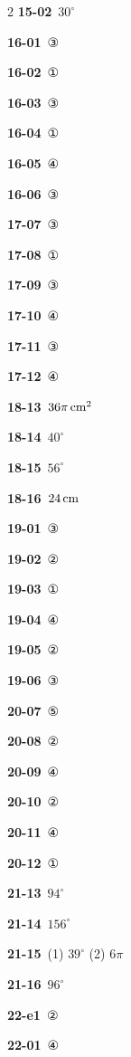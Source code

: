 \documentclass[10pt,a4paper]{article}
\begin{document}
\begin{multicols}{2}
\noindent\textbf{15-02}\ $30^\circ$\par
\noindent\textbf{16-01}\ ③\par
\noindent\textbf{16-02}\ ①\par
\noindent\textbf{16-03}\ ③\par
\noindent\textbf{16-04}\ ①\par
\noindent\textbf{16-05}\ ④\par
\noindent\textbf{16-06}\ ③\par
\noindent\textbf{17-07}\ ③\par
\noindent\textbf{17-08}\ ①\par
\noindent\textbf{17-09}\ ③\par
\noindent\textbf{17-10}\ ④\par
\noindent\textbf{17-11}\ ③\par
\noindent\textbf{17-12}\ ④\par
\noindent\textbf{18-13}\ $36\pi\mkern3mu \mathrm{cm}^2$\par
\noindent\textbf{18-14}\ $40^\circ$\par
\noindent\textbf{18-15}\ $56^\circ$\par
\noindent\textbf{18-16}\ $24\mkern3mu \mathrm{cm}$\par
\noindent\textbf{19-01}\ ③\par
\noindent\textbf{19-02}\ ②\par
\noindent\textbf{19-03}\ ①\par
\noindent\textbf{19-04}\ ④\par
\noindent\textbf{19-05}\ ②\par
\noindent\textbf{19-06}\ ③\par
\noindent\textbf{20-07}\ ⑤\par
\noindent\textbf{20-08}\ ②\par
\noindent\textbf{20-09}\ ④\par
\noindent\textbf{20-10}\ ②\par
\noindent\textbf{20-11}\ ④\par
\noindent\textbf{20-12}\ ①\par
\noindent\textbf{21-13}\ $94^\circ$\par
\noindent\textbf{21-14}\ $156^\circ$\par
\noindent\textbf{21-15}\ (1) $39^\circ$ (2) $6\pi$\par
\noindent\textbf{21-16}\ $96^\circ$\par
\noindent\textbf{22-e1}\ ②\par
\noindent\textbf{22-01}\ ④\par

\end{multicols}
\end{document}
